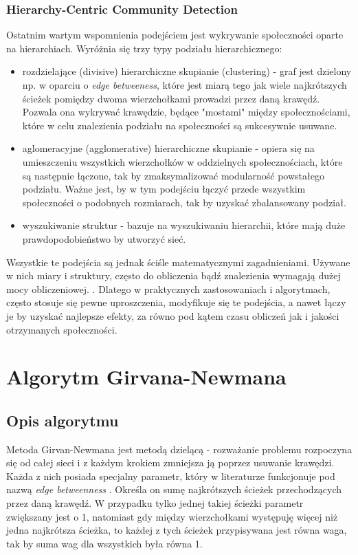 \documentclass{article}
\begin{document}
\subsubsection{Hierarchy-Centric Community Detection}
Ostatnim wartym wspomnienia podejściem jest wykrywanie społeczności oparte na hierarchiach. Wyróżnia się trzy typy podziału hierarchicznego:
\begin{itemize}
\item rozdzielające (divisive) hierarchiczne skupianie (clustering) - graf jest dzielony np. w oparciu o \textit{edge betweeness}, które jest miarą tego jak wiele najkrótszych ścieżek pomiędzy dwoma wierzchołkami prowadzi przez daną krawędź. Pozwala ona wykrywać krawędzie, będące "mostami" między społecznościami, które w celu znalezienia podziału na społeczności są sukcesywnie usuwane.
\item aglomeracyjne (agglomerative) hierarchiczne skupianie - opiera się na umieszczeniu wszystkich wierzchołków w oddzielnych społecznościach, które są następnie łączone, tak by zmaksymalizować modularność powstałego podziału. Ważne jest, by w tym podejściu łączyć przede wszystkim społeczności o podobnych rozmiarach, tak by uzyskać zbalansowany podział.
\item wyszukiwanie struktur - bazuje na wyszukiwaniu hierarchii, które mają duże prawdopodobieństwo by utworzyć sieć.
\end{itemize}

Wszystkie te podejścia są jednak ściśle matematycznymi zagadnieniami. Używane w nich miary i struktury, często do obliczenia bądź znalezienia wymagają dużej mocy obliczeniowej. \cite{pw-paper1}. Dlatego w praktycznych zastosowaniach i algorytmach, często stosuje się pewne uproszczenia, modyfikuje się te podejścia, a nawet łączy je by uzyskać najlepsze efekty, za równo pod kątem czasu obliczeń jak i jakości otrzymanych społeczności.
\newpage
\section{Algorytm Girvana-Newmana}
\subsection{Opis algorytmu}
Metoda Girvan-Newmana jest metodą dzielącą - rozważanie problemu rozpoczyna się od całej sieci i z każdym krokiem zmniejsza ją poprzez usuwanie krawędzi. Każda z nich posiada specjalny parametr, który w literaturze funkcjonuje pod nazwą \textit{edge betweenness} \cite{is-paper1}. Określa on sumę najkrótszych ścieżek przechodzących przez daną krawędź. W przypadku tylko jednej takiej ścieżki parametr zwiększany jest o 1, natomiast gdy między wierzchołkami występuję więcej niż jedna najkrótsza ścieżka, to każdej z tych ścieżek przypisywana jest równa waga, tak by suma wag dla wszystkich była równa 1.
\end{document}
